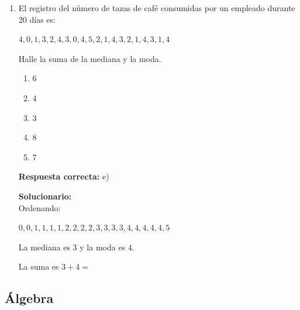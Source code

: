 \begin{enumerate}
	$x^2-1=16-1=$
	
	\vspace{6mm}
	
	\item El registro del número de tazas de café consumidas por un empleado durante 20 días es:
	
	$4,0,1,3,2,4,3,0,4,5,2,1,4,3,2,1,4,3,1,4$
	
	Halle la suma de la mediana y la moda.
	\begin{enumerate}[label=\alph*)]
		\item 6
		\item 4
		\item 3
		\item 8
		\item 7
	\end{enumerate}
	\textbf{Respuesta correcta:} e)
	
	\vspace{2mm}
	\textbf{Solucionario:}\\
	Ordenando:
	
	$0,0,1,1,1,1,2,2,2,2,3,3,3,3,4,4,4,4,4,5$
	
	La mediana es $3$ y la moda es $4$.
	
	La suma es $3+4=$
	
	\vspace{6mm}
\end{enumerate}

\subsection*{Álgebra}

